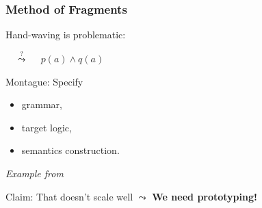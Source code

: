 \begin{frame}
    \frametitle{Method of Fragments}
    {\color{hlfont}Hand-waving} is problematic:

    \hspace{2em}
    {$\quad\stackrel{?}{\leadsto}\quad$ \color{logicfont} $p(a)\wedge q(a)$}

    \vspace{1.2em}
    {\color{hlfont}Montague}: Specify
    \begin{itemize}
        \item grammar,
        \item target logic,
        \item semantics construction.
    \end{itemize}

    {
        \centering
        \vspace{0.3em}
        {\itshape\footnotesize Example from~\cite{Montague:tptoqi73}}

        \vspace{0.2em}

        \vspace{1.2em}
        Claim: That doesn't scale well $\leadsto$ \textbf{We need {\color{hlfont}prototyping}!}
    }

\end{frame}
